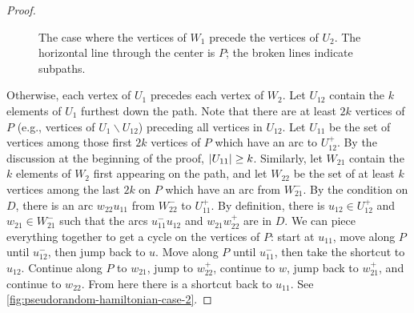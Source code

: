 \documentclass[11pt,english]{article}
\theoremstyle{plain}
\theoremstyle{definition}
\theoremstyle{definition}
\theoremstyle{plain}
\theoremstyle{plain}
\theoremstyle{plain}
\theoremstyle{plain}
\theoremstyle{remark}
\theoremstyle{remark}
\let\originalleft\left
\let\originalright\right
\renewcommand{\left}{\mathopen{}\mathclose\bgroup\originalleft}
\renewcommand{\right}{\aftergroup\egroup\originalright}
\begin{document}
\begin{proof}
\begin{figure}[H]
\begin{center}
\hspace{0.5cm}
\hspace{0.5cm}
\end{center}

\protect\caption{\label{fig:pseudorandom-hamiltonian-case-1}The case where the vertices
of $W_{1}$ precede the vertices of $U_{2}$. The horizontal line
through the center is $P$; the broken lines indicate subpaths.}
\end{figure}


Otherwise, each vertex of $U_{1}$ precedes each vertex of $W_{2}$.
Let $U_{12}$ contain the $k$ elements of $U_{1}$ furthest down
the path. Note that there are at least $2k$ vertices of $P$ (e.g., vertices of $U_1\backslash U_{12}$) preceding all vertices in $U_{12}$. 
Let $U_{11}$ be the set of vertices among those first $2k$
vertices of $P$ which have an arc to $U_{12}^{+}$. By the discussion
at the beginning of the proof, $\left|U_{11}\right|\ge k$. Similarly,
let $W_{21}$ contain the $k$ elements of $W_{2}$ first appearing
on the path, and let $W_{22}$ be the set of at least $k$ vertices
among the last $2k$ on $P$ which have an arc from $W_{21}^{-}$.
By the condition on $D$, there is an arc $w_{22}u_{11}$ from $W_{22}^{-}$
to $U_{11}^{+}$. By definition, there is $u_{12}\in U_{12}^{+}$
and $w_{21}\in W_{21}^{-}$ such that the arcs $u_{11}^{-}u_{12}$
and $w_{21}w_{22}^{+}$ are in $D$. We can piece everything together
to get a cycle on the vertices of $P$: start at $u_{11}$, move along
$P$ until $u_{12}^{-}$, then jump back to $u$. Move along $P$
until $u_{11}^{-}$, then take the shortcut to $u_{12}$. Continue
along $P$ to $w_{21}$, jump to $w_{22}^{+}$, continue to $w$,
jump back to $w_{21}^{+}$, and continue to $w_{22}$. From here there
is a shortcut back to $u_{11}$. See \ref{fig:pseudorandom-hamiltonian-case-2}.


\end{proof}
\end{document}
